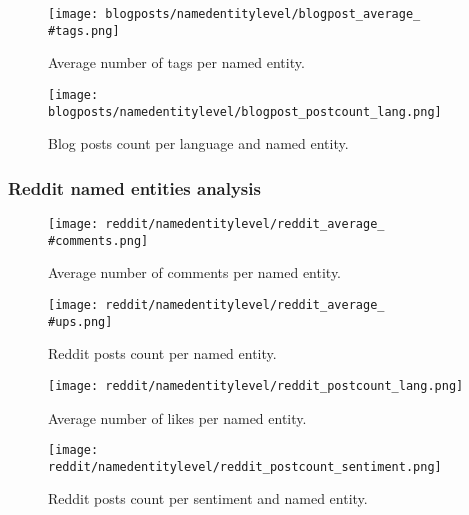 \begin{figure}[H]
	\begin{center}
		\texttt{[image: blogposts/namedentitylevel/blogpost\_average\_\\\#tags.png]}
		\caption{Average number of tags per named entity.}
		\label{fig:blogpost_average_tags_entity}
	\end{center}
\end{figure}

\begin{figure}[H]
	\begin{center}
		\texttt{[image: blogposts/namedentitylevel/blogpost\_postcount\_lang.png]}
		\caption{Blog posts count per language and named entity.}
		\label{fig:blogposts_postcount_lang_entity}
	\end{center}
\end{figure}



\subsubsection{Reddit named entities analysis}
\begin{figure}[H]
	\begin{center}
		\texttt{[image: reddit/namedentitylevel/reddit\_average\_\\\#comments.png]}
		\caption{Average number of comments per named entity.}
		\label{fig:reddit_average_comments_entity}
	\end{center}
\end{figure}

\begin{figure}[H]
	\begin{center}
		\texttt{[image: reddit/namedentitylevel/reddit\_average\_\\\#ups.png]}
		\caption{Reddit posts count per named entity.}
		\label{fig:reddit_average_ups_entity}
	\end{center}
\end{figure}

\begin{figure}[H]
	\begin{center}
		\texttt{[image: reddit/namedentitylevel/reddit\_postcount\_lang.png]}
		\caption{Average number of likes per named entity.}
		\label{fig:reddit_postcount_lang_entity}
	\end{center}
\end{figure}

\begin{figure}[H]
	\begin{center}
		\texttt{[image: reddit/namedentitylevel/reddit\_postcount\_sentiment.png]}
		\caption{Reddit posts count per sentiment and named entity.}
		\label{fig:reddit_postcount_sentiment_entity}
	\end{center}
\end{figure}
	
